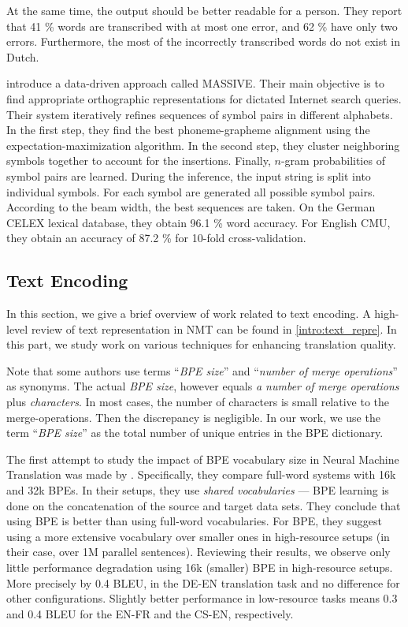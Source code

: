 At the same time, the output should be better readable for a person. They report that 41 \% words are transcribed with at most one error, and 62 \% have only two errors. Furthermore, the most of the incorrectly transcribed words do not exist in Dutch.

 introduce a data-driven approach called MASSIVE. Their main objective is to find appropriate orthographic representations for dictated Internet search queries. Their system iteratively refines sequences of symbol pairs in different alphabets. In the first step, they find the best phoneme-grapheme alignment using the expectation-maximization algorithm. In the second step, they cluster neighboring symbols together to account for the insertions. Finally, $n$-gram probabilities of symbol pairs are learned. During the inference, the input string is split into individual symbols. For each symbol are generated all possible symbol pairs. According to the beam width, the best sequences are taken. On the German CELEX lexical database, they obtain 96.1 \% word accuracy. For English CMU, they obtain an accuracy of 87.2 \% for 10-fold cross-validation.

\subsection{Text Encoding}
\label{easr:re_encoding}
In this section, we give a brief overview of work related to text encoding. A high-level review of text representation in NMT can be found in \cref{intro:text_repre}. In this part, we study work on various techniques for enhancing translation quality. 

Note that some authors use terms ``\textit{BPE size}'' and ``\textit{number of merge operations}'' as synonyms. The actual \textit{BPE size}, however equals \textit{a number of merge operations} plus \textit{characters}. In most cases, the number of characters is small relative to the merge-operations. Then the discrepancy is negligible. In our work, we use the term ``\textit{BPE size}'' as the total number of unique entries in the BPE dictionary.

The first attempt to study the impact of BPE vocabulary size in Neural Machine Translation was made by . Specifically, they compare full-word systems with 16k and 32k BPEs. In their setups, they use \textit{shared vocabularies} --- BPE learning is done on the concatenation of the source and target data sets. They conclude that using BPE is better than using full-word vocabularies. For BPE, they suggest using a more extensive vocabulary over smaller ones in high-resource setups (in their case, over 1M parallel sentences). Reviewing their results, we observe only little performance degradation using 16k (smaller) BPE in high-resource setups. More precisely by 0.4 BLEU, in the DE-EN translation task and no difference for other configurations. Slightly better performance in low-resource tasks means 0.3 and 0.4 BLEU for the EN-FR and the CS-EN, respectively.

